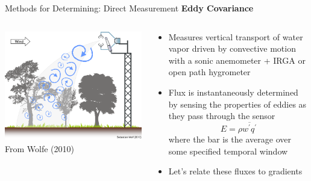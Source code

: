 \begin{frame}{Methods for Determining: Direct Measurement}
\textbf{Eddy Covariance}
\begin{columns}[T]
    \begin{column}{.4\textwidth}
    \begin{minipage}[c][0.7\textheight][c]{\linewidth}
    \includegraphics[width=1\textwidth]{fig3}\\
    \centering \small From Wolfe (2010)
    \end{minipage}
    \end{column}
    \begin{column}{.6\textwidth}
    \begin{minipage}[c][0.6\textheight][c]{\linewidth}
   \begin{itemize}
   	\item Measures vertical transport of water vapor driven by convective motion with a sonic anemometer + IRGA or open path hygrometer
   	\item Flux is instantaneously determined by sensing the properties of eddies as they pass through the sensor
   	$$E = \rho \overline{w^\prime q^\prime}$$
   	where the bar is the average over some specified temporal window
   	\item Let's relate these fluxes to gradients
   \end{itemize}
      \end{minipage}
    \end{column}
  \end{columns}
\end{frame}

